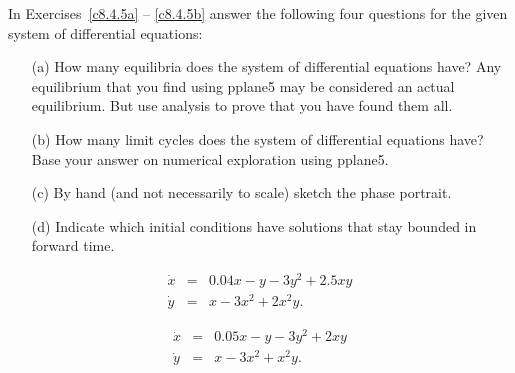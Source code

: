 \documentclass{ximera}
\begin{document}
\noindent In Exercises~\ref{c8.4.5a} -- \ref{c8.4.5b} answer the following 
four questions for the given system of differential equations:
\begin{itemize}
\item[(a)]  How many equilibria does the system of differential equations 
have?  Any equilibrium that you find using {\sf pplane5} may be considered an 
actual equilibrium.  But use analysis to prove that you have found them all.
\item[(b)]  How many limit cycles does the system of differential equations 
have?  Base your answer on numerical exploration using {\sf pplane5}.
\item[(c)]  By hand (and not necessarily to scale) sketch the phase portrait.
\item[(d)]  Indicate which initial conditions have solutions that stay
bounded in forward time.
\end{itemize}
\begin{exercise}  \label{c8.4.5a}
\begin{equation*} 
\begin{array}{rcl}
\dot{x} & = & 0.04x - y - 3y^2 + 2.5xy\\
\dot{y} & = & x - 3x^2 + 2x^2y.
\end{array}
\end{equation*}
\end{exercise}
\begin{exercise}  \label{c8.4.5b}
\begin{equation*} 
\begin{array}{rcl}
\dot{x} & = & 0.05x - y - 3y^2 + 2xy \\
\dot{y} & = & x - 3x^2 + x^2y.
\end{array}
\end{equation*}
\end{exercise}
\end{document}
